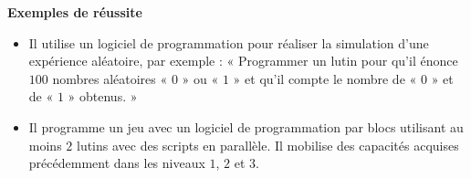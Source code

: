 \documentclass[10pt]{article}
\newcommand{\LR}{\begin{tikzpicture} \draw[Bleu,fill=Bleu] (0.05,0) -- (0,0.075) -- (-0.05,0) -- (0,-0.075) --cycle; \end{tikzpicture}}
\newenvironment{exemplesreussite}{%
    \renewcommand{\labelitemi}{\LR}%
    \renewcommand{\labelitemii}{-}%
    \color{black}%
    \par\textbf{Exemples de réussite}
    \begin{itemize}
    \setlength{\itemsep}{-0.2em}%
}{
    \end{itemize}
}
\begin{document}
\begin{exemplesreussite}
        \item Il utilise un logiciel de programmation pour réaliser la simulation d’une expérience aléatoire, par exemple : « Programmer un lutin pour qu’il énonce $100$ nombres aléatoires « $0$ » ou « $1$ » et qu’il compte le nombre de « $0$ » et de « $1$ » obtenus. »
        \item Il programme un jeu avec un logiciel de programmation par blocs utilisant au moins $2$ lutins avec des scripts en parallèle. Il mobilise des capacités acquises précédemment dans les niveaux $1$, $2$ et $3$.
    \end{exemplesreussite}
    
\end{document}
